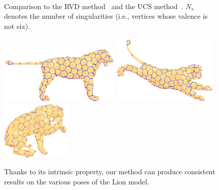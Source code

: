 \begin{figure}[htbp]
\\
  \\
\\
\caption{Comparison to the RVD method~\cite{DBLP:conf/gmp/YanWLL10} and the UCS method~\cite{Rong:2011:CVT}. $N_s$ denotes the number of singularities (i.e., vertices whose valence is not six).}
\label{fig:rvd}
\end{figure}

\begin{figure}[htbp]
\centering
\includegraphics[height=1.1in]{figs/cvt/lion0.png}
\includegraphics[height=1.3in]{figs/cvt/lion5.png}
\includegraphics[height=1.1in]{figs/cvt/lion9.png}\\
\caption{Thanks to its intrinsic property, our method can produce consistent results on the various poses of the Lion model.}
\label{fig:lion}
\end{figure}


